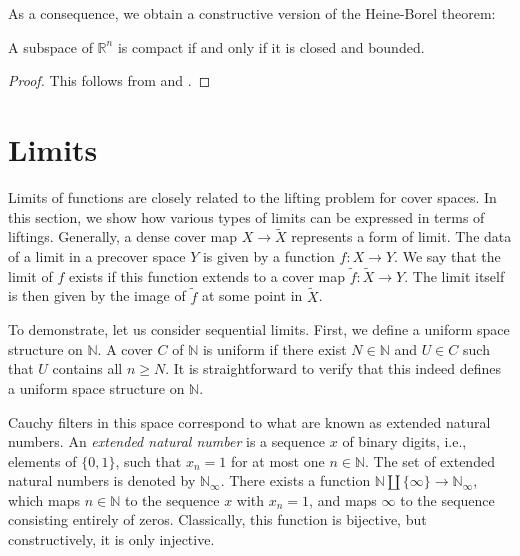 \documentclass[reqno]{amsart}
\theoremstyle{definition}
\theoremstyle{remark}
\numberwithin{figure}{section}
\begin{document}
As a consequence, we obtain a constructive version of the Heine-Borel theorem:

\begin{cor}
A subspace of $\mathbb{R}^n$ is compact if and only if it is closed and bounded.
\end{cor}
\begin{proof}
This follows from  and .
\end{proof}

\section{Limits}
\label{sec:limits}

Limits of functions are closely related to the lifting problem for cover spaces.
In this section, we show how various types of limits can be expressed in terms of liftings.
Generally, a dense cover map $X \to \widetilde{X}$ represents a form of limit.
The data of a limit in a precover space $Y$ is given by a function $f : X \to Y$.
We say that the limit of $f$ exists if this function extends to a cover map $\widetilde{f} : \widetilde{X} \to Y$.
The limit itself is then given by the image of $\widetilde{f}$ at some point in $\widetilde{X}$.

To demonstrate, let us consider sequential limits.
First, we define a uniform space structure on $\mathbb{N}$.
A cover $C$ of $\mathbb{N}$ is uniform if there exist $N \in \mathbb{N}$ and $U \in C$ such that $U$ contains all $n \geq N$.
It is straightforward to verify that this indeed defines a uniform space structure on $\mathbb{N}$.

Cauchy filters in this space correspond to what are known as extended natural numbers.
An \emph{extended natural number} is a sequence $x$ of binary digits, i.e., elements of $\{ 0, 1 \}$, such that $x_n = 1$ for at most one $n \in \mathbb{N}$.
The set of extended natural numbers is denoted by $\mathbb{N}_\infty$.
There exists a function $\mathbb{N} \amalg \{ \infty \} \to \mathbb{N}_\infty$, which maps $n \in \mathbb{N}$ to the sequence $x$ with $x_n = 1$, and maps $\infty$ to the sequence consisting entirely of zeros.
Classically, this function is bijective, but constructively, it is only injective.
\end{document}
